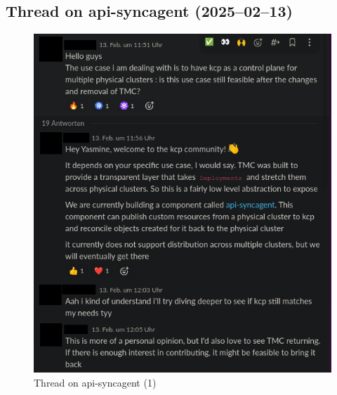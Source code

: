 \documentclass[11pt, a4paper, oneside, listof=totoc]{scrartcl}
\begin{document}
            \subsection{Thread on api-syncagent (2025--02--13)}
                \begin{figure}[h!]
                    \centering
                    \includegraphics[width=\textwidth]{screenshots/slack/apisyncagent1.anonymized.png}
                    \caption{Thread on api-syncagent (1)}\label{fig:api-syncagent1}
                \end{figure}
\end{document}
